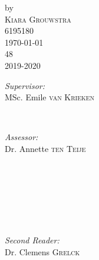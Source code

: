 \begin{titlepage}
by\\[0.2cm]
\textsc{\Large
        Kiara Grouwstra
}\\[0.2cm]
    6195180
\\[1cm]



{\Large \today}\\[1cm]

    48
\\
    2019-2020
\\[1cm]

\begin{minipage}[t]{0.4\textwidth}
\begin{flushleft} \large
\emph{Supervisor:} \\
    MSc. Emile \textsc{van Krieken}
\end{flushleft}
\end{minipage}
~
\begin{minipage}[t]{0.4\textwidth}
\begin{flushright} \large
\emph{Assessor:} \\
    Dr. Annette \textsc{ten Teije}
\\
\end{flushright}
\end{minipage}\\[2cm]
~
\begin{minipage}[t]{0.4\textwidth}
\begin{flushleft} \large
\emph{} \\
\end{flushleft}
\end{minipage}
~
\begin{minipage}[t]{0.4\textwidth}
\begin{flushright} \large
\emph{Second Reader:} \\
    Dr. Clemens \textsc{Grelck}
\\
\end{flushright}
\end{minipage}\\[2cm]
    

\end{titlepage}

